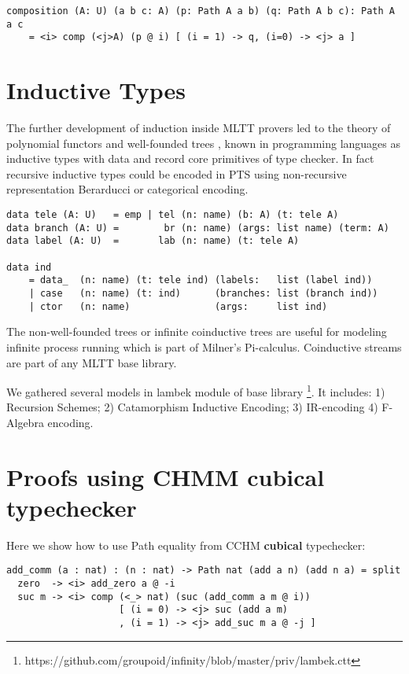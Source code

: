 \documentclass{aip-cp}
\begin{document}
\begin{lstlisting}[mathescape=true]
composition (A: U) (a b c: A) (p: Path A a b) (q: Path A b c): Path A a c
    = <i> comp (<j>A) (p @ i) [ (i = 1) -> q, (i=0) -> <j> a ]
\end{lstlisting}

\section{Inductive Types}

The further development of induction \cite{Dybjer94,Vene00} inside MLTT provers led
to the theory of polynomial functors and well-founded trees \cite{Gambino03},
known in programming languages as inductive types with data
and record core primitives of type checker. In fact recursive inductive
types \cite{Wadler90} could be encoded in PTS using non-recursive representation
Berarducci \cite {Bohm85} or categorical encoding.

\begin{lstlisting}[mathescape=true]
data tele (A: U)   = emp | tel (n: name) (b: A) (t: tele A)
data branch (A: U) =        br (n: name) (args: list name) (term: A)
data label (A: U)  =       lab (n: name) (t: tele A)

data ind
    = data_  (n: name) (t: tele ind) (labels:   list (label ind))
    | case   (n: name) (t: ind)      (branches: list (branch ind))
    | ctor   (n: name)               (args:     list ind)
\end{lstlisting}

The non-well-founded trees or infinite coinductive trees \cite{Jacobs97,Basold16}
are useful for modeling infinite process running which is
part of Milner's Pi-calculus. Coinductive streams are
part of any MLTT base library.

We gathered several models in lambek module of base library \footnote{https://github.com/groupoid/infinity/blob/master/priv/lambek.ctt}.
It includes: 1) Recursion Schemes; 2) Catamorphism Inductive Encoding; 3) IR-encoding 4) F-Algebra encoding.

\section{Proofs using CHMM cubical typechecker}

Here we show how to use Path equality from CCHM {\bf cubical} typechecker:

\begin{lstlisting}[mathescape=true]
add_comm (a : nat) : (n : nat) -> Path nat (add a n) (add n a) = split
  zero  -> <i> add_zero a @ -i
  suc m -> <i> comp (<_> nat) (suc (add_comm a m @ i))
                    [ (i = 0) -> <j> suc (add a m)
                    , (i = 1) -> <j> add_suc m a @ -j ]
\end{lstlisting}
\end{document}
